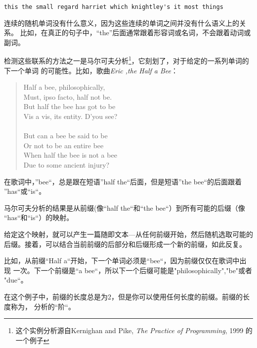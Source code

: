  \beforeverb
\begin{verbatim}
this the small regard harriet which knightley's it most things
\end{verbatim}
\afterverb
%

连续的随机单词没有什么意义，因为这些连续的单词之间并没有什么语义上的关系。
比如，在真正的句子中，“the”后面通常跟着形容词或名词，不会跟着动词或副词。

检测这些联系的方法之一是马尔可夫分析\footnote{这个实例分析源自Kernighan and
	Pike, {\em The Practice of Programming}, 1999
		的一个例子}，它刻划了，对于给定的一系列单词的下一个单词
		的可能性。比如，歌曲{\em Eric ,the Half a Bee}：

\begin{quote}
Half a bee, philosophically, \\
Must, ipso facto, half not be. \\
But half the bee has got to be \\
Vis a vis, its entity. D'you see? \\
\\
But can a bee be said to be \\
Or not to be an entire bee \\
When half the bee is not a bee \\
Due to some ancient injury? \\
\end{quote}

在歌词中，”bee“，总是跟在短语”half the“后面，但是短语”the bee“的后面跟着
”has“或“is“。


马尔可夫分析的结果是从前缀(像“half the“和“the bee“）到所有可能的后缀（像
		“has“和“is“）的映射。




给定这个映射，就可以产生一篇随即文本---从任何前缀开始，然后随机选取可能的
后缀。接着，可以结合当前前缀的后部分和后缀形成一个新的前缀，如此反复。

比如，从前缀“Half a“开始，下一个单词必须是“bee“，因为前缀仅仅在歌词中出现
一次。下一个前缀是“a bee“，所以下一个后缀可能是"philosophically","be"或者
"due“。

在这个例子中，前缀的长度总是为2，但是你可以使用任何长度的前缀。前缀的长度称为，
分析的“阶“。


